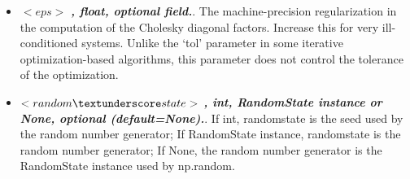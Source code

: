 \begin{itemize}
  \item $<eps>$ \textbf{\textit{, float, optional field.}}. The machine-precision regularization in the computation of the Cholesky diagonal factors. Increase this for very ill-conditioned systems. Unlike the ‘tol’ parameter in some iterative optimization-based algorithms, this parameter does not control the tolerance of the optimization.
  \item $<random\textunderscore state>$ \textbf{\textit{, int, RandomState instance or None, optional (default=None).}}. If int, random\textunderscore state is the seed used by the random number generator; If RandomState instance, random\textunderscore state is the random number generator; If None, the random number generator is the RandomState instance used by np.random.
\end{itemize}

